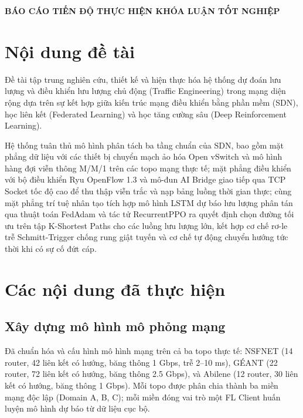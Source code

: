 \documentclass[11pt,a4paper]{article}
\begin{document}

\begin{center}
    {\Large\bfseries BÁO CÁO TIẾN ĐỘ THỰC HIỆN KHÓA LUẬN TỐT NGHIỆP}
\end{center}

\vspace{0.4cm}

\section{Nội dung đề tài}

Đề tài tập trung nghiên cứu, thiết kế và hiện thực hóa hệ thống dự đoán lưu lượng và điều khiển lưu lượng chủ động (Traffic Engineering) trong mạng diện rộng dựa trên sự kết hợp giữa kiến trúc mạng điều khiển bằng phần mềm (SDN), học liên kết (Federated Learning) và học tăng cường sâu (Deep Reinforcement Learning).

Hệ thống tuân thủ mô hình phân tách ba tầng chuẩn của SDN, bao gồm mặt phẳng dữ liệu với các thiết bị chuyển mạch ảo hóa Open vSwitch và mô hình hàng đợi viễn thông M/M/1 trên các topo mạng thực tế; mặt phẳng điều khiển với bộ điều khiển Ryu OpenFlow 1.3 và mô-đun AI Bridge giao tiếp qua TCP Socket tốc độ cao để thu thập viễn trắc và nạp bảng luồng thời gian thực; cùng mặt phẳng trí tuệ nhân tạo tích hợp mô hình LSTM dự báo lưu lượng phân tán qua thuật toán FedAdam và tác tử RecurrentPPO ra quyết định chọn đường tối ưu trên tập K-Shortest Paths cho các luồng lưu lượng lớn, kết hợp cơ chế rơ-le trễ Schmitt-Trigger chống rung giật tuyến và cơ chế tự động chuyển hướng tức thời khi có sự cố đứt cáp.

\section{Các nội dung đã thực hiện}

\subsection{Xây dựng mô hình mô phỏng mạng}
Đã chuẩn hóa và cấu hình mô hình mạng trên cả ba topo thực tế: NSFNET (14 router, 42 liên kết có hướng, băng thông 1 Gbps, trễ 2–10 ms), GÉANT (22 router, 72 liên kết có hướng, băng thông 2.5 Gbps), và Abilene (12 router, 30 liên kết có hướng, băng thông 1 Gbps). Mỗi topo được phân chia thành ba miền mạng độc lập (Domain A, B, C); mỗi miền đóng vai trò một FL Client huấn luyện mô hình dự báo từ dữ liệu cục bộ.
\end{document}
